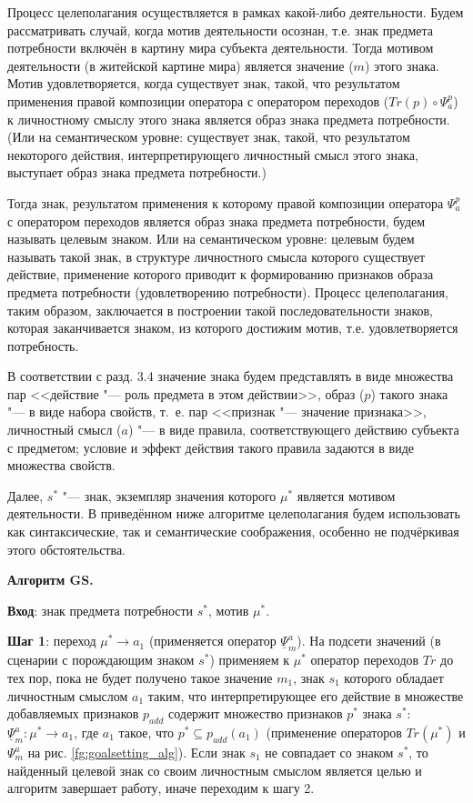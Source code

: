 \begin{appendices}
Процесс целеполагания осуществляется в рамках какой-либо деятельности. Будем рассматривать случай, когда мотив деятельности осознан, т.е. знак предмета потребности включён в картину мира субъекта деятельности. Тогда мотивом деятельности (в житейской картине мира) является значение ($m$) этого знака. Мотив удовлетворяется, когда существует знак, такой, что результатом применения правой композиции оператора   с оператором переходов ($Tr(p)\circ\Psi_a^p$) к личностному смыслу этого знака является образ знака предмета потребности. (Или на семантическом уровне: существует знак, такой, что результатом некоторого действия, интерпретирующего личностный смысл этого знака, выступает образ знака предмета потребности.)

Тогда знак, результатом применения к которому правой композиции оператора $\Psi_a^p$ с оператором переходов является образ знака предмета потребности, будем называть целевым знаком. Или на семантическом уровне: целевым будем называть такой знак, в структуре личностного смысла которого существует действие, применение которого приводит к формированию признаков образа предмета потребности (удовлетворению потребности). Процесс целеполагания, таким образом, заключается в построении такой последовательности знаков, которая заканчивается знаком, из которого достижим мотив, т.е. удовлетворяется потребность.

В соответствии с разд. 3.4 значение знака будем представлять в виде множества пар <<действие "--- роль предмета в этом действии>>, образ ($p$) такого знака "--- в виде набора свойств, т.~е. пар <<признак "--- значение признака>>, личностный смысл ($a$) "--- в виде правила, соответствующего действию субъекта с предметом; условие и эффект действия такого правила задаются в виде множества свойств.

Далее, $s^*$ "--- знак, экземпляр значения которого $\mu^*$ является мотивом деятельности. В приведённом ниже алгоритме целеполагания будем использовать как синтаксические, так и семантические соображения, особенно не подчёркивая этого обстоятельства.

\textbf{Алгоритм GS.}

\textbf{Вход}: знак предмета потребности $s^*$, мотив $\mu^*$.

\textbf{Шаг 1}: переход $\mu^*\rightarrow a_1$ (применяется оператор $\underline{\Psi}_m^a$). На подсети значений (в сценарии с порождающим знаком $s^*$) применяем к $\mu^*$ оператор переходов $Tr$ до тех пор, пока не будет получено такое значение $m_1$, знак $s_1$ которого обладает личностным смыслом $a_1$ таким, что интерпретирующее его действие в множестве добавляемых признаков $p_{add}$ содержит множество признаков $p^*$ знака $s^*$:  $\underline{\Psi}_m^a:\mu^*\rightarrow a_1$, где $a_1$ такое, что $p^*\subseteq p_{add}(a_1)$ (применение операторов $Tr(\mu^*)$ и $\Psi_m^a$ на рис. \ref{fg:goalsetting_alg}). Если знак $s_1$ не совпадает со знаком $s^*$, то найденный целевой знак со своим личностным смыслом является целью и алгоритм завершает работу, иначе переходим к шагу 2.


\end{appendices}
